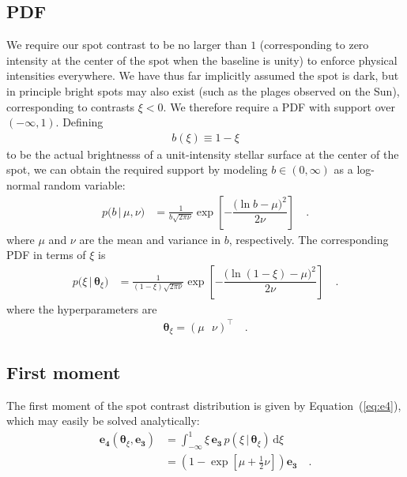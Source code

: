 \documentclass[modern]{aastex62}
\begin{document}
\subsection{PDF}
\label{sec:contrast-pdf}
We require our
spot contrast to be no larger than $1$ (corresponding to zero intensity
at the center of the spot when the baseline is unity) to enforce physical
intensities
everywhere. We have thus far implicitly assumed the spot is dark, but
in principle bright spots may also exist
(such as the plages observed on the Sun), corresponding to contrasts
$\xi < 0$. We therefore require a PDF with support over $(-\infty, 1)$.
Defining
%
\begin{align}
    b(\xi) \equiv 1 - \xi
\end{align}
%
to be the actual brightnesss of a unit-intensity stellar surface at
the center of the spot,
we can obtain the required support by modeling
$b \in (0, \infty)$ as a log-normal
random variable:
%
\begin{align}
    \label{eq:lognormal}
    p \big(b \, \big| \, \mu, \nu \big)
     & =
    \frac{1}{b\sqrt{2\pi\nu}}
    \exp\left[
        -\dfrac{\big(\ln b - \mu\big)^2}{2\nu}
        \right]
    \quad.
\end{align}
%
where $\mu$ and $\nu$ are the mean and variance in $b$, respectively.
The corresponding PDF in terms of $\xi$ is
%
\begin{align}
    \label{eq:lognormal}
    p \big(\xi \, \big| \, \pmb{\theta}_\xi \big)
     & =
    \frac{1}{(1 - \xi)\sqrt{2\pi\nu}}
    \exp\left[
        -\dfrac{\big(\ln (1 - \xi) - \mu\big)^2}{2\nu}
        \right]
    \quad.
\end{align}
%
where the hyperparameters are
%
\begin{align}
    \pmb{\theta}_\xi = \left(
    \mu \, \, \, \,
    \nu \right)^\top
    \quad.
\end{align}
%

\subsection{First moment}
\label{sec:contrast-mom1}
The first moment of the spot contrast distribution is given by
Equation~(\ref{eq:e4}), which may easily be solved analytically:
%
\begin{align}
    \mathbf{e_4}(\pmb{\theta}_\xi, \mathbf{e_3})
     & =
    \int_{-\infty}^1
    \xi \,
    \mathbf{e_3} \,
    p(\xi \, \big| \, \pmb{\theta}_{\xi}) \,
    \mathrm{d}\xi
    \nonumber
    \\
     & =
    \left(1 - \exp\left[ \mu + \frac{1}{2}\nu\right]\right) \mathbf{e_3}
    \quad.
\end{align}
%
\end{document}
